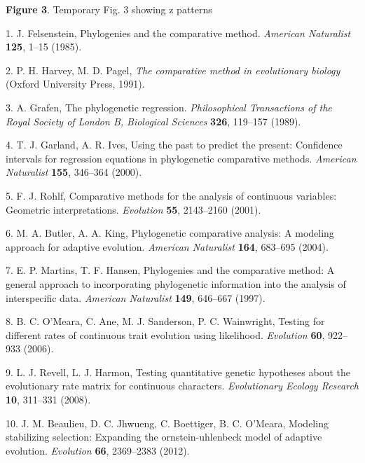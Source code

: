 \documentclass[]{article}
\begin{document}
\singlespacing \textbf{Figure 3}. Temporary Fig. 3 showing z patterns

\newpage

\hypertarget{refs}{}
\leavevmode\hypertarget{ref-Felsenstein1985}{}%
1. J. Felsenstein, Phylogenies and the comparative method.
\emph{American Naturalist} \textbf{125}, 1--15 (1985).

\leavevmode\hypertarget{ref-HarveyPagel1991}{}%
2. P. H. Harvey, M. D. Pagel, \emph{The comparative method in
evolutionary biology} (Oxford University Press, 1991).

\leavevmode\hypertarget{ref-Grafen1989}{}%
3. A. Grafen, The phylogenetic regression. \emph{Philosophical
Transactions of the Royal Society of London B, Biological Sciences}
\textbf{326}, 119--157 (1989).

\leavevmode\hypertarget{ref-GarlandIves2000}{}%
4. T. J. Garland, A. R. Ives, Using the past to predict the present:
Confidence intervals for regression equations in phylogenetic
comparative methods. \emph{American Naturalist} \textbf{155}, 346--364
(2000).

\leavevmode\hypertarget{ref-Rohlf2001}{}%
5. F. J. Rohlf, Comparative methods for the analysis of continuous
variables: Geometric interpretations. \emph{Evolution} \textbf{55},
2143--2160 (2001).

\leavevmode\hypertarget{ref-ButlerKing2004}{}%
6. M. A. Butler, A. A. King, Phylogenetic comparative analysis: A
modeling approach for adaptive evolution. \emph{American Naturalist}
\textbf{164}, 683--695 (2004).

\leavevmode\hypertarget{ref-MartinsHansen1997}{}%
7. E. P. Martins, T. F. Hansen, Phylogenies and the comparative method:
A general approach to incorporating phylogenetic information into the
analysis of interspecific data. \emph{American Naturalist} \textbf{149},
646--667 (1997).

\leavevmode\hypertarget{ref-OMeara_et_al2006}{}%
8. B. C. O'Meara, C. Ane, M. J. Sanderson, P. C. Wainwright, Testing for
different rates of continuous trait evolution using likelihood.
\emph{Evolution} \textbf{60}, 922--933 (2006).

\leavevmode\hypertarget{ref-RevellHarmon2008}{}%
9. L. J. Revell, L. J. Harmon, Testing quantitative genetic hypotheses
about the evolutionary rate matrix for continuous characters.
\emph{Evolutionary Ecology Research} \textbf{10}, 311--331 (2008).

\leavevmode\hypertarget{ref-Beaulieu_et_al2012}{}%
10. J. M. Beaulieu, D. C. Jhwueng, C. Boettiger, B. C. O'Meara, Modeling
stabilizing selection: Expanding the ornstein-uhlenbeck model of
adaptive evolution. \emph{Evolution} \textbf{66}, 2369--2383 (2012).
\end{document}
